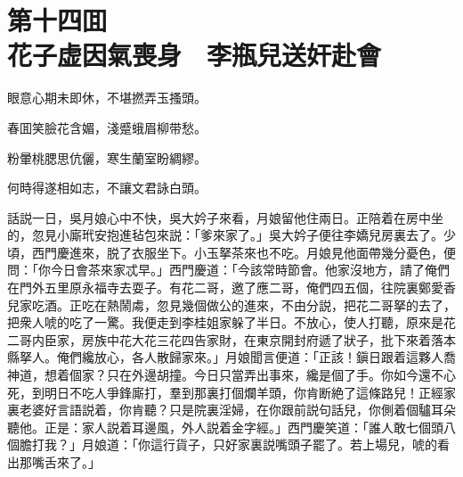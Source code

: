 
\chapter*{第十四囬　\\花子虚因氣喪身　李瓶兒送奸赴會}


\begin{myquote}
眼意心期未即休，不堪撚弄玉搔頭。

春囬笑臉花含媚，淺蹙蛾眉柳带愁。

粉暈桃腮思伉儷，寒生蘭室盼綢繆。

何時得遂相如志，不讓文君詠白頭。
\end{myquote}

話説一日，吳月娘心中不快，吳大妗子來看，月娘留他住兩日。正陪着在房中坐的，忽見小廝玳安抱進毡包來説：「爹來家了。」吳大妗子便往李嬌兒房裏去了。少頃，西門慶進來，脱了衣服坐下。小玉拏茶來也不吃。月娘見他面帶幾分憂色，便問：「你今日會茶來家忒早。」西門慶道：「今該常時節會。他家沒地方，請了俺們在門外五里原永福寺去耍子。有花二哥，邀了應二哥，俺們四五個，往院裏鄭愛香兒家吃酒。正吃在熱鬧䖏，忽見幾個做公的進來，不由分説，把花二哥拏的去了，把衆人唬的吃了一驚。我便走到李桂姐家躲了半日。不放心，使人打聽，原來是花二哥内臣家，房族中花大花三花四告家財，在東京開封府遞了狀子，批下來着落本縣拏人。俺們纔放心，各人散歸家來。」月娘聞言便道：「正該！鎭日跟着這夥人喬神道，想着個家？只在外邊胡撞。今日只當弄出事來，纔是個了手。你如今還不心死，到明日不吃人爭鋒廝打，羣到那裏打個爛羊頭，你肯断絶了這條路兒！正經家裏老婆好言語説着，你肯聽？只是院裏淫婦，在你跟前説句話兒，你側着個驢耳朵聽他。正是：家人説着耳邊風，外人説着金字經。」西門慶笑道：「誰人敢七個頭八個膽打我？」月娘道：「你這行貨子，只好家裏説嘴頭子罷了。若上場兒，唬的看出那嘴舌來了。」

